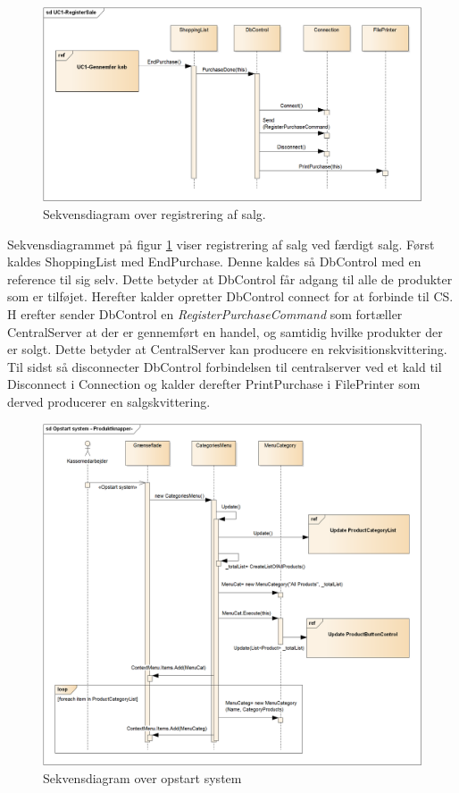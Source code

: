 \begin{figure}[H]
	\centering
	\includegraphics[width=1\textwidth]{Systemdesign/Frontend/GUI/DesignOgStruktur/Pics/RegisterSale}
	\caption{Sekvensdiagram over registrering af salg.}
	\label{fig:SekvensRegisterSale}
\end{figure}

Sekvensdiagrammet på figur \ref{fig:SekvensRegisterSale} viser registrering af salg ved færdigt salg. Først kaldes ShoppingList med EndPurchase. Denne kaldes så DbControl med en reference til sig selv. Dette betyder at DbControl får adgang til alle de produkter som er tilføjet. Herefter kalder opretter DbControl connect for at forbinde til \gls{CS}. H	erefter sender DbControl en \textit{RegisterPurchaseCommand} som fortæller CentralServer at der er gennemført en handel, og samtidig hvilke produkter der er solgt. Dette betyder at CentralServer kan producere en rekvisitionskvittering. Til sidst så disconnecter DbControl forbindelsen til centralserver ved et kald til Disconnect i Connection og kalder derefter PrintPurchase i FilePrinter som derved producerer en salgskvittering.

\begin{figure}[H]
	\centering
	\includegraphics[width=1\textwidth]{Systemdesign/Frontend/GUI/DesignOgStruktur/Pics/OpstartSystem2}
	\caption{Sekvensdiagram over opstart system}
	\label{fig:SekvensOpstart}
\end{figure}

